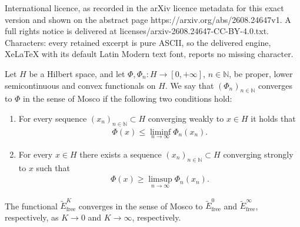 \documentclass[10pt,a4paper]{amsart}
\newcommand{\N}{\mathbb N}
\newcommand{\free}{\mathrm{free}}
\begin{document}
International licence, as recorded in the arXiv licence metadata for this exact version and shown on the abstract page https://arxiv.org/abs/2608.24647v1. A full rights notice is delivered at licenses/arxiv-2608.24647-CC-BY-4.0.txt. Characters: every retained excerpt is pure ASCII, so the delivered engine, XeLaTeX with its default Latin Modern text font, reports no missing character.
\begin{definition}
    Let $H$ be a Hilbert space, and let $\Phi,\Phi_n:H\rightarrow [0,+\infty]$, $n\in\N$, be proper, lower semicontinuous and convex functionals on $H$. We say that $(\Phi_n)_{n\in\N}$ converges to $\Phi$ in the sense of Mosco if the following two conditions hold:
    \begin{enumerate}[label=\textnormal{\bfseries(M\arabic*)}]
        \item \label{Mosco1} For every sequence $(x_n)_{n\in\N}\subset H$ converging weakly to $x\in H$ it holds that
        \begin{align*}
            \Phi(x) \leq \liminf_{n\rightarrow\infty} \Phi_n(x_n).
        \end{align*}
        \item \label{Mosco2} For every $x\in H$ there exists a sequence $(x_n)_{n\in\N}\subset H$ converging strongly to $x$ such that
        \begin{align*}
            \Phi(x) \geq \limsup_{n\rightarrow\infty} \Phi_n(x_n).
        \end{align*}
    \end{enumerate}
\end{definition}

\begin{proposition}\label{Proposition:MoscoConvergence}
    The functional $\widetilde E_\free^K$ converges in the sense of Mosco to $\widetilde E_\free^0$ and $\widetilde E_\free^\infty$, respectively, as $K\rightarrow 0$ and $K\rightarrow\infty$, respectively.
\end{proposition}
\end{document}
